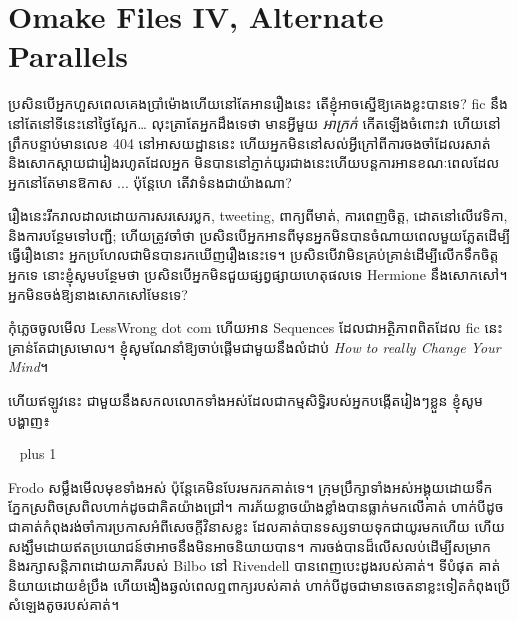 
\makeatletter
\newcommand{\OmakeIVspecialsection}[2][1.5]{%
\vspace*{2\baselineskip plus 1\textheight minus 1\baselineskip}%
\noindent\hfill\scalebox{#1}{#2}\hfill\mbox{ }%
\vskip 1\baselineskip plus 1\baselineskip%
\@afterindentfalse\@afterheading
}
\makeatother

\newcommand{\OmakeIVsection}[2][1.5]{%
  \OmakeIVspecialsection[#1]{\MakeUppercase{#2}}}

\chapter{Omake Files IV, Alternate Parallels}

\begin{chapterOpeningAuthorNote}
ប្រសិនបើអ្នកហួសពេលគេងប្រាំម៉ោងហើយនៅតែអានរឿងនេះ តើខ្ញុំអាចស្នើឱ្យគេងខ្លះបានទេ? fic នឹងនៅតែនៅទីនេះនៅថ្ងៃស្អែក… លុះត្រាតែអ្នកដឹងទេថា មានអ្វីមួយ \emph{អាក្រក់} កើតឡើងចំពោះវា ហើយនៅព្រឹកបន្ទាប់មានលេខ 404 នៅអាសយដ្ឋាននេះ ហើយអ្នកមិននៅសល់អ្វីក្រៅពីការចងចាំដែលរសាត់ និងសោកស្តាយជារៀងរហូតដែលអ្នក មិន​បាន​នៅ​ភ្ញាក់​យូរ​ជាង​នេះ​ហើយ​បន្ត​ការ​អាន​ខណៈ​ពេល​ដែល​អ្នក​នៅ​តែ​មាន​ឱកាស ... ប៉ុន្តែ​ហេ តើ​វា​ទំនង​ជា​យ៉ាង​ណា?

រឿងនេះរីករាលដាលដោយការសរសេរប្លក, tweeting, ពាក្យពីមាត់, ការពេញចិត្ត, ដោតនៅលើវេទិកា, និងការបន្ថែមទៅបញ្ជី; ហើយត្រូវចាំថា ប្រសិនបើអ្នកអានពីមុនអ្នកមិនបានចំណាយពេលមួយភ្លែតដើម្បីធ្វើរឿងនោះ អ្នកប្រហែលជាមិនបានរកឃើញរឿងនេះទេ។ ប្រសិនបើវាមិនគ្រប់គ្រាន់ដើម្បីលើកទឹកចិត្តអ្នកទេ នោះខ្ញុំសូមបន្ថែមថា ប្រសិនបើអ្នកមិនជួយផ្សព្វផ្សាយហេតុផលទេ Hermione នឹងសោកសៅ។ អ្នកមិនចង់ឱ្យនាងសោកសៅមែនទេ?

កុំភ្លេចចូលមើល LessWrong dot com ហើយអាន Sequences ដែលជាអត្ថិភាពពិតដែល fic នេះគ្រាន់តែជាស្រមោល។ ខ្ញុំសូមណែនាំឱ្យចាប់ផ្តើមជាមួយនឹងលំដាប់ \emph{How to really Change Your Mind}។

ហើយឥឡូវនេះ ជាមួយនឹងសកលលោកទាំងអស់ដែលជាកម្មសិទ្ធិរបស់អ្នកបង្កើតរៀងៗខ្លួន ខ្ញុំសូមបង្ហាញ៖
\end{chapterOpeningAuthorNote}

\OmakeIVspecialsection[1.6]{\fontspec[ExternalLocation]{RingBearer}
\settowidth{\versewidth}{\mbox{the}} Lord\scalebox{.40}{\parbox[b]{\versewidth}{%
  \centering នៃ\\
\nointerlineskip\vskip 4pt the}}Ratîonalît\raisebox{-.32ex}{Y}}

Frodo សម្លឹងមើលមុខទាំងអស់ ប៉ុន្តែគេមិនបែរមករកគាត់ទេ។ ក្រុម​ប្រឹក្សា​ទាំង​អស់​អង្គុយ​ដោយ​ទឹក​ភ្នែក​ស្រពិចស្រពិល​ហាក់​ដូច​ជា​គិត​យ៉ាង​ជ្រៅ។ ការភ័យខ្លាចយ៉ាងខ្លាំងបានធ្លាក់មកលើគាត់ ហាក់បីដូចជាគាត់កំពុងរង់ចាំការប្រកាសអំពីសេចក្ដីវិនាសខ្លះ ដែលគាត់បានទស្សទាយទុកជាយូរមកហើយ ហើយសង្ឃឹមដោយឥតប្រយោជន៍ថាអាចនឹងមិនអាចនិយាយបាន។ ការចង់បានដ៏លើសលប់ដើម្បីសម្រាក និងរក្សាសន្តិភាពដោយភាគីរបស់ Bilbo នៅ Rivendell បានពេញបេះដូងរបស់គាត់។ ទីបំផុត គាត់និយាយដោយខំប្រឹង ហើយងឿងឆ្ងល់ពេលឮពាក្យរបស់គាត់ ហាក់បីដូចជាមានចេតនាខ្លះទៀតកំពុងប្រើសំឡេងតូចរបស់គាត់។

